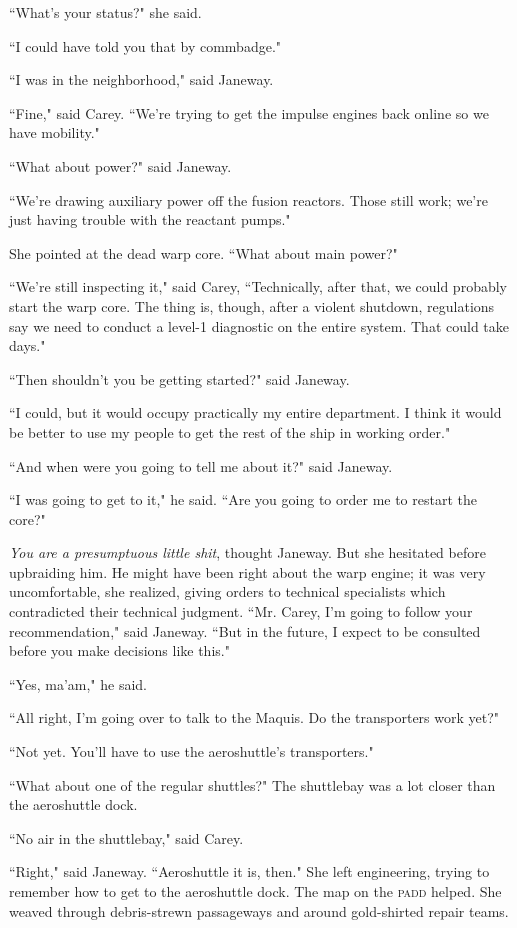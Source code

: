\documentclass[twoside,letterpaper,12pt]{memoir}
\begin{document}
``What's your status?" she said.

``I could have told you that by commbadge."

``I was in the neighborhood," said Janeway.

``Fine," said Carey. ``We're trying to get the impulse engines back online so we have mobility."

``What about power?" said Janeway.

``We're drawing auxiliary power off the fusion reactors. Those still work; we're just having trouble with the reactant pumps."

She pointed at the dead warp core. ``What about main power?"

``We're still inspecting it," said Carey, ``Technically, after that, we could probably start the warp core. The thing is, though, after a violent shutdown, regulations say we need to conduct a level-1 diagnostic on the entire system. That could take days."

``Then shouldn't you be getting started?" said Janeway.

``I could, but it would occupy practically my entire department. I think it would be better to use my people to get the rest of the ship in working order."

``And when were you going to tell me about it?" said Janeway.

``I was going to get to it," he said. ``Are you going to order me to restart the core?"

\textit{You are a presumptuous little shit}, thought Janeway. But she hesitated before upbraiding him. He might have been right about the warp engine; it was very uncomfortable, she realized, giving orders to technical specialists which contradicted their technical judgment. ``Mr. Carey, I'm going to follow your recommendation," said Janeway. ``But in the future, I expect to be consulted before you make decisions like this."

``Yes, ma'am," he said.

``All right, I'm going over to talk to the Maquis. Do the transporters work yet?"

``Not yet. You'll have to use the aeroshuttle's transporters."

``What about one of the regular shuttles?" The shuttlebay was a lot closer than the aeroshuttle dock.

``No air in the shuttlebay," said Carey.

``Right," said Janeway. ``Aeroshuttle it is, then." She left engineering, trying to remember how to get to the aeroshuttle dock. The map on the \textsc{padd} helped. She weaved through debris-strewn passageways and around gold-shirted repair teams.
\end{document}
